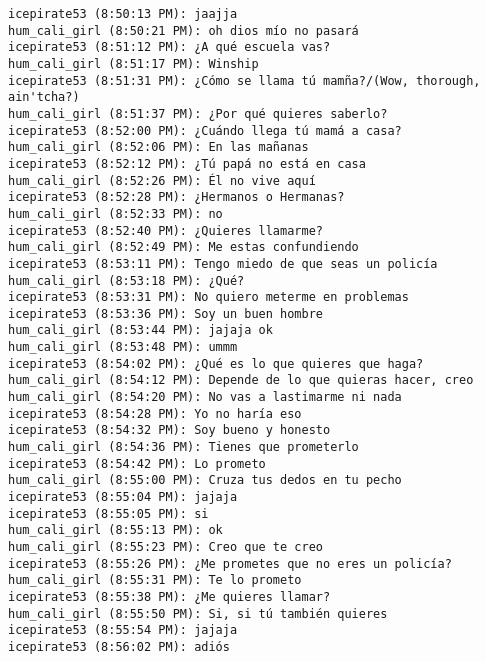 \begin{verbatim}
icepirate53 (8:50:13 PM): jaajja
hum_cali_girl (8:50:21 PM): oh dios mío no pasará
icepirate53 (8:51:12 PM): ¿A qué escuela vas?
hum_cali_girl (8:51:17 PM): Winship
icepirate53 (8:51:31 PM): ¿Cómo se llama tú mamña?/(Wow, thorough, ain'tcha?)
hum_cali_girl (8:51:37 PM): ¿Por qué quieres saberlo?
icepirate53 (8:52:00 PM): ¿Cuándo llega tú mamá a casa?
hum_cali_girl (8:52:06 PM): En las mañanas
icepirate53 (8:52:12 PM): ¿Tú papá no está en casa
hum_cali_girl (8:52:26 PM): Él no vive aquí
icepirate53 (8:52:28 PM): ¿Hermanos o Hermanas?
hum_cali_girl (8:52:33 PM): no
icepirate53 (8:52:40 PM): ¿Quieres llamarme?
hum_cali_girl (8:52:49 PM): Me estas confundiendo
icepirate53 (8:53:11 PM): Tengo miedo de que seas un policía 
hum_cali_girl (8:53:18 PM): ¿Qué?
icepirate53 (8:53:31 PM): No quiero meterme en problemas
icepirate53 (8:53:36 PM): Soy un buen hombre
hum_cali_girl (8:53:44 PM): jajaja ok
hum_cali_girl (8:53:48 PM): ummm
icepirate53 (8:54:02 PM): ¿Qué es lo que quieres que haga?
hum_cali_girl (8:54:12 PM): Depende de lo que quieras hacer, creo
hum_cali_girl (8:54:20 PM): No vas a lastimarme ni nada
icepirate53 (8:54:28 PM): Yo no haría eso
icepirate53 (8:54:32 PM): Soy bueno y honesto
hum_cali_girl (8:54:36 PM): Tienes que prometerlo
icepirate53 (8:54:42 PM): Lo prometo
hum_cali_girl (8:55:00 PM): Cruza tus dedos en tu pecho
icepirate53 (8:55:04 PM): jajaja
icepirate53 (8:55:05 PM): si
hum_cali_girl (8:55:13 PM): ok
hum_cali_girl (8:55:23 PM): Creo que te creo
icepirate53 (8:55:26 PM): ¿Me prometes que no eres un policía?
hum_cali_girl (8:55:31 PM): Te lo prometo
icepirate53 (8:55:38 PM): ¿Me quieres llamar?
hum_cali_girl (8:55:50 PM): Si, si tú también quieres
icepirate53 (8:55:54 PM): jajaja
icepirate53 (8:56:02 PM): adiós
\end{verbatim}









